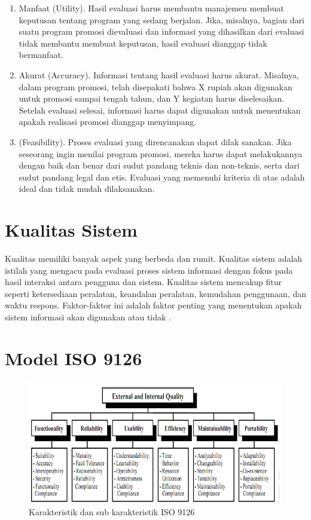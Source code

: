 \begin{enumerate}
	\item Manfaat (Utility). Hasil evaluasi harus membantu manajemen membuat keputusan tentang program yang sedang berjalan. Jika, misalnya, bagian dari suatu program promosi dievaluasi dan informasi yang dihasilkan dari evaluasi tidak membantu membuat keputusan, hasil evaluasi dianggap tidak bermanfaat.
	\item Akurat (Accuracy). Informasi tentang hasil evaluasi harus akurat. Misalnya, dalam program promosi, telah disepakati bahwa X rupiah akan digunakan untuk promosi sampai tengah tahun, dan Y kegiatan harus diselesaikan. Setelah evaluasi selesai, informasi harus dapat digunakan untuk menentukan apakah realisasi promosi dianggap menyimpang.
	\item  (Feasibility). Proses evaluasi yang direncanakan dapat dilak sanakan. Jika seseorang ingin menilai program promosi, mereka harus dapat melakukannya dengan baik dan benar dari sudut pandang teknis dan non-teknis, serta dari sudut pandang legal dan etis. Evaluasi yang memenuhi kriteria di atas adalah ideal dan tidak mudah dilaksanakan.
\end{enumerate}

\section{Kualitas Sistem}
Kualitas memiliki banyak aspek yang berbeda dan rumit. Kualitas sistem adalah istilah yang mengacu pada evaluasi proses sistem informasi dengan fokus pada hasil interaksi antara pengguna dan sistem. Kualitas sistem mencakup fitur seperti ketersediaan peralatan, keandalan peralatan, kemudahan penggunaan, dan waktu respons. Faktor-faktor ini adalah faktor penting yang menentukan apakah sistem informasi akan digunakan atau tidak \cite{pawirosumarto2016pengaruh}.

\section{Model ISO 9126}

\begin{figure}
  \centering
  \includegraphics[width=0.82\linewidth]{konten//gambar/Model-Iso.png}
  \caption{Karakteristik dan sub karakteristik ISO 9126}
  \label{fig:enter-label}
\end{figure}

